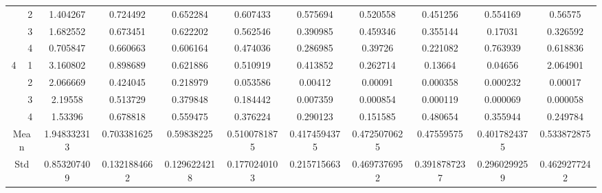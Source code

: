 \documentclass[draft,dvipsnames]{drexel-thesis}
\begin{document}
\begin{thesis}
\begin{table}[!t]
{\begin{tabular}{|c|c|c|c|c|c|c|c|c|c|c|}
                      & 2                   & 1.404267    & 0.724492     & 0.652284     & 0.607433     & 0.575694     & 0.520558     & 0.451256     & 0.554169     & 0.56575      \\ \cline{2-11}
                      & 3                   & 1.682552    & 0.673451     & 0.622202     & 0.562546     & 0.390985     & 0.459346     & 0.355144     & 0.17031      & 0.326592     \\ \cline{2-11}
                      & 4                   & 0.705847    & 0.660663     & 0.606164     & 0.474036     & 0.286985     & 0.39726      & 0.221082     & 0.763939     & 0.618836     \\ \hline
\multirow{4}{*}{4}    & 1                   & 3.160802    & 0.898689     & 0.621886     & 0.510919     & 0.413852     & 0.262714     & 0.13664      & 0.04656      & 2.064901     \\ \cline{2-11}
                      & 2                   & 2.066669    & 0.424045     & 0.218979     & 0.053586     & 0.00412      & 0.00091      & 0.000358     & 0.000232     & 0.00017      \\ \cline{2-11}
                      & 3                   & 2.19558     & 0.513729     & 0.379848     & 0.184442     & 0.007359     & 0.000854     & 0.000119     & 0.000069     & 0.000058     \\ \cline{2-11}
                      & 4                   & 1.53396     & 0.678818     & 0.559475     & 0.376224     & 0.290123     & 0.151585     & 0.480654     & 0.355944     & 0.249784     \\ \hline
\multicolumn{2}{|c|}{Mean}                  & 1.948332313 & 0.703381625  & 0.59838225   & 0.5100781875 & 0.4174594375 & 0.4725070625 & 0.47559575   & 0.4017824375 & 0.533872875  \\ \hline
\multicolumn{2}{|c|}{Std}                   & 0.853207409 & 0.1321884662 & 0.1296224218 & 0.1770240103 & 0.215715663  & 0.4697376952 & 0.3918787237 & 0.2960299259 & 0.4629277242 \\ \hline
\end{tabular}}
\end{table}


\end{thesis}
\end{document}
